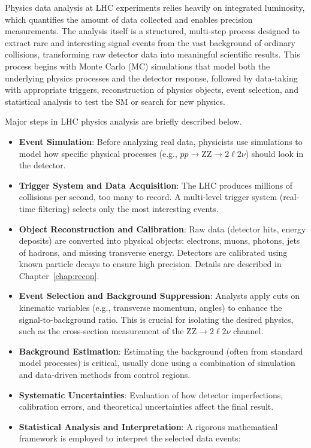 Physics data analysis at LHC experiments relies heavily on integrated luminosity, which quantifies the amount of data collected and enables precision measurements. The analysis itself is a structured, multi-step process designed to extract rare and interesting signal events from the vast background of ordinary collisions, transforming raw detector data into meaningful scientific results. This process begins with Monte Carlo (MC) simulations that model both the underlying physics processes and the detector response, followed by data-taking with appropriate triggers, reconstruction of physics objects, event selection, and statistical analysis to test the SM or search for new physics.

Major steps in LHC physics analysis are briefly described below.
\begin{itemize}
\item \textbf{Event Simulation}: Before analyzing real data, physicists use simulations to model how specific physical processes (e.g., $pp \to \text{ZZ} \to 2\ell 2\nu$) should look in the detector.
\item \textbf{Trigger System and Data Acquisition}: The LHC produces millions of collisions per second, too many to record. A multi-level trigger system (real-time filtering) selects only the most interesting events.
\item \textbf{Object Reconstruction and Calibration}: Raw data (detector hits, energy deposits) are converted into physical objects: electrons, muons, photons, jets of hadrons, and missing transverse energy. Detectors are calibrated using known particle decays to ensure high precision. Details are described in Chapter~\ref{chap:recon}.
\item \textbf{Event Selection and Background Suppression}: Analysts apply cuts on kinematic variables (e.g., transverse momentum, angles) to enhance the signal-to-background ratio. This is crucial for isolating the desired physics, such as the cross-section measurement of the $\text{ZZ} \to 2\ell 2\nu$ channel.
\item \textbf{Background Estimation}: Estimating the background (often from standard model processes) is critical, usually done using a combination of simulation and data-driven methods from control regions.
\item \textbf{Systematic Uncertainties}: Evaluation of how detector imperfections, calibration errors, and theoretical uncertainties affect the final result. 
\item \textbf{Statistical Analysis and Interpretation}: A rigorous mathematical framework is employed to interpret the selected data events:

\end{itemize}
